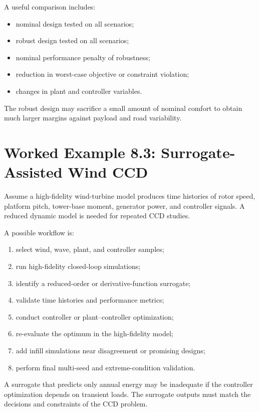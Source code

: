 \documentclass[11pt]{article}
\begin{document}
A useful comparison includes:
\begin{itemize}[leftmargin=1.4em]
  \item nominal design tested on all scenarios;
  \item robust design tested on all scenarios;
  \item nominal performance penalty of robustness;
  \item reduction in worst-case objective or constraint violation;
  \item changes in plant and controller variables.
\end{itemize}

The robust design may sacrifice a small amount of nominal comfort to obtain much larger margins against payload and road variability.

\section{Worked Example 8.3: Surrogate-Assisted Wind CCD}

Assume a high-fidelity wind-turbine model produces time histories of rotor speed, platform pitch, tower-base moment, generator power, and controller signals. A reduced dynamic model is needed for repeated CCD studies.

A possible workflow is:
\begin{enumerate}[leftmargin=1.5em]
  \item select wind, wave, plant, and controller samples;
  \item run high-fidelity closed-loop simulations;
  \item identify a reduced-order or derivative-function surrogate;
  \item validate time histories and performance metrics;
  \item conduct controller or plant--controller optimization;
  \item re-evaluate the optimum in the high-fidelity model;
  \item add infill simulations near disagreement or promising designs;
  \item perform final multi-seed and extreme-condition validation.
\end{enumerate}

A surrogate that predicts only annual energy may be inadequate if the controller optimization depends on transient loads. The surrogate outputs must match the decisions and constraints of the CCD problem.
\end{document}
